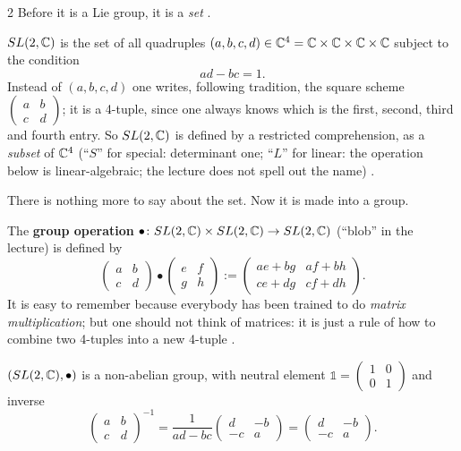 \begin{paracol}{2}
Before it is a Lie group, it is a \emph{set} .
\begin{definition}\label{def:sl-set}
$SL(2,\C)$ is the set of all quadruples $(a,b,c,d)\in\mathbb{C}^4=\mathbb{C}\times\mathbb{C}\times\mathbb{C}\times\mathbb{C}$ subject to the condition
\[
  ad-bc=1 .
\]
Instead of $(a,b,c,d)$ one writes, following tradition, the square scheme $\begin{pmatrix}a&b\\c&d\end{pmatrix}$; it is a 4-tuple, since one always knows which is the first, second, third and fourth entry. So $SL(2,\C)$ is defined by a restricted comprehension, as a \emph{subset} of $\mathbb{C}^4$ (``$S$'' for special: determinant one; ``$L$'' for linear: the operation below is linear-algebraic; the lecture does not spell out the name)     .
\end{definition}
There is nothing more to say about the set. Now it is made into a group.
\begin{definition}\label{def:sl-op}
The \textbf{group operation} $\bullet\colon SL(2,\mathbb{C})\times SL(2,\mathbb{C})\to SL(2,\mathbb{C})$ (``blob'' in the lecture) is defined by
\[
  \begin{pmatrix}a&b\\c&d\end{pmatrix}\bullet\begin{pmatrix}e&f\\g&h\end{pmatrix}
  :=\begin{pmatrix}ae+bg&af+bh\\ce+dg&cf+dh\end{pmatrix}.
\]
It is easy to remember because everybody has been trained to do \emph{matrix multiplication}; but one should not think of matrices: it is just a rule of how to combine two 4-tuples into a new 4-tuple     .
\end{definition}
\begin{proposition}[$SL(2,\C)$ is a group]\label{prop:sl-group}
$(SL(2,\mathbb{C}),\bullet)$ is a non-abelian group, with neutral element $\mathbb 1=\begin{pmatrix}1&0\\0&1\end{pmatrix}$ and inverse
\[
  \begin{pmatrix}a&b\\c&d\end{pmatrix}^{-1}=\frac1{ad-bc}\begin{pmatrix}d&-b\\-c&a\end{pmatrix}=\begin{pmatrix}d&-b\\-c&a\end{pmatrix}.
\]
\end{proposition}
\end{paracol}
